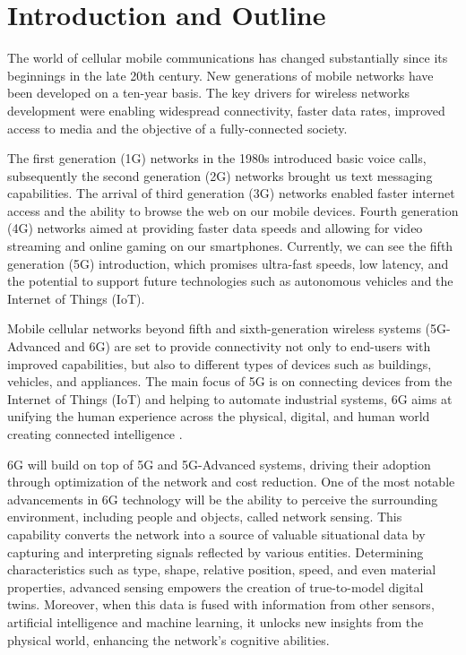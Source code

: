 \chapter{Introduction and Outline}
\label{chap_intro}

The world of cellular mobile communications has changed substantially since its beginnings in the late 20th century.
New generations of mobile networks have been developed on a ten-year basis. The key drivers for wireless networks development were enabling widespread connectivity, faster data rates, improved access to media and the objective of a fully-connected society.

The first generation (1G) networks in the 1980s introduced basic voice calls, subsequently the second generation (2G) networks brought us text messaging capabilities. The arrival of third generation (3G) networks enabled faster internet access and the ability to browse the web on our mobile devices. 
Fourth generation (4G) networks aimed at providing faster data speeds and allowing for video streaming and online gaming on our smartphones. 
Currently, we can see the fifth generation (5G) introduction, which promises ultra-fast speeds, low latency, and the potential to support future technologies such as autonomous vehicles and the Internet of Things (IoT). 

Mobile cellular networks beyond fifth and sixth-generation wireless systems (5G-Advanced and 6G) are set to provide connectivity not only to end-users with improved capabilities, but also to different types of devices such as buildings, vehicles, and appliances.
The main focus of 5G is on connecting devices from the Internet of Things (IoT) and helping to automate industrial systems, 6G aims at unifying the human experience across the physical, digital, and human world creating connected intelligence \cite{6G-explained-NOKIA}.


6G will build on top of 5G and 5G-Advanced systems, driving their adoption through optimization of the network and cost reduction. 
One of the most notable advancements in 6G technology will be the ability to perceive the surrounding environment, including people and objects, called network sensing. This capability converts the network into a source of valuable situational data by capturing and interpreting signals reflected by various entities. 
Determining characteristics such as type, shape, relative position, speed, and even material properties, advanced sensing empowers the creation of true-to-model digital twins.
Moreover, when this data is fused with information from other sensors, artificial intelligence and machine learning, it unlocks new insights from the physical world, enhancing the network's cognitive abilities.


